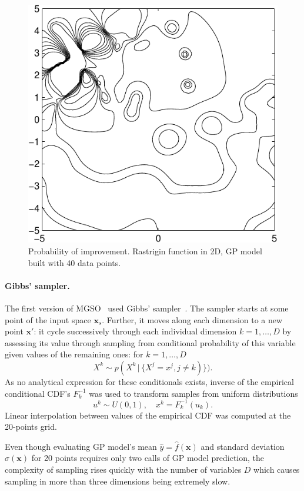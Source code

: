 \documentclass{itatnew}
\newcommand{\xx}{\mathrm{\mathbf{x}}}
\begin{document}
\begin{figure}
  \centering
  \includegraphics[width=0.6\linewidth]{poi_example}
  {\small
  \caption{Probability of improvement. Rastrigin function in 2D, GP model built with 40 data points.
  \label{fig:poi}
  }
  }
\end{figure}

\paragraph{Gibbs' sampler.}

The first version of MGSO~\cite{bajer_model_2013} used Gibbs' sampler~\cite{geman_stochastic_1984}. The sampler starts at some point of the input space $\xx_s$. Further, it moves along each dimension to a new point $\xx'$: it cycle successively through each individual dimension $k = 1,\ldots,D$ by assessing its value through sampling from conditional probability of this variable given values of the remaining ones: for $k=1,\ldots,D$
\begin{equation}
X^k \sim p(X^k \, | \, \{X^j = x^j, j \neq k)\}).
\end{equation}
As no analytical expression for these conditionals exists, inverse of the empirical conditional CDF's $F^{-1}_k$ was used to transform samples from uniform distributions
\begin{displaymath}
u^k \sim U(0,1), \quad  x^k = F^{-1}_k(u_k).
\end{displaymath}
Linear interpolation between values of the empirical CDF was computed at the 20-points grid.

Even though evaluating GP model's mean $\hat{y} = \hat{f}(\xx)$ and standard deviation $\hat{\sigma}(\xx)$ for 20 points requires only two calls of GP model prediction, the complexity of sampling rises quickly with the number of variables $D$ which causes sampling in more than three dimensions being extremely slow.
\end{document}
